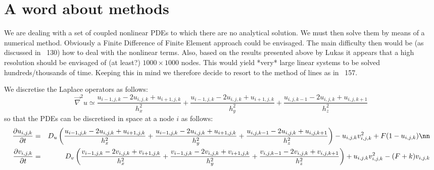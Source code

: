 \section*{A word about methods}

We are dealing with a set of coupled nonlinear PDEs to which there are no analytical solution.
We must then solve them by means of a numerical method. 
Obviously a Finite Difference of Finite Element approach could be envisaged. The main difficulty then
would be (as discussed in \stone~130) how to deal with the nonlinear terms. Also, based on 
the results presented above by Lukas it appears that a high resolution should be envisaged
of (at least?) $1000\times 1000$ nodes. This would yield *very* large linear systems to be 
solved hundreds/thousands of time.
Keeping this in mind we therefore decide to resort to the method of lines as in \stone~157.

We discretise the Laplace operators as follows:
\[
\vec\nabla^2 u \simeq 
\frac{u_{i-1,j,k}-2u_{i,j,k}+u_{i+1,j,k}}{h_x^2} + 
\frac{u_{i-1,j,k}-2u_{i,j,k}+u_{i+1,j,k}}{h_y^2} + 
\frac{u_{i,j,k-1}-2u_{i,j,k}+u_{i,j,k+1}}{h_z^2} 
\]
so that the PDEs can be discretised in space at a node $i$ as follows:
\begin{eqnarray}
\frac{\partial u_{i,j,k}}{\partial t} &=& D_u 
\left(
\frac{u_{i-1,j,k}-2u_{i,j,k}+u_{i+1,j,k}}{h_x^2} + 
\frac{u_{i-1,j,k}-2u_{i,j,k}+u_{i+1,j,k}}{h_y^2} + 
\frac{u_{i,j,k-1}-2u_{i,j,k}+u_{i,j,k+1}}{h_z^2} 
\right)
- u_{i,j,k}v_{i,j,k}^2 + F(1-u_{i,j,k}) 
\nn\\
\frac{\partial v_{i,j,k}}{\partial t} &=& D_v 
\left(
\frac{v_{i-1,j,k}-2v_{i,j,k}+v_{i+1,j,k}}{h_x^2} + 
\frac{v_{i-1,j,k}-2v_{i,j,k}+v_{i+1,j,k}}{h_y^2} + 
\frac{v_{i,j,k-1}-2v_{i,j,k}+v_{i,j,k+1}}{h_z^2} 
\right)
+ u_{i,j,k}v_{i,j,k}^2 - (F+k)v_{i,j,k}
\end{eqnarray}










